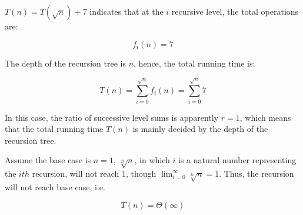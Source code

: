 \begin{homeworkProblem}
\begin{homeworkSubProblem}[$T(n)=3T(n/2)+5n$]
\end{homeworkSubProblem}

\begin{homeworkSubProblem}[$T(n)=T(\sqrt{n})+7$]

$T(n)=T(\sqrt{n})+7$ indicates that at the $i$ recursive level, the total operations are:

\begin{equation}
f_i(n) = 7
\end{equation}

The depth of the recursion tree is $n$, hence, the total running time is:

\begin{equation}
T(n) =\sum_{i=0}^{\sqrt{n}} f_i(n) = \sum_{i=0}^{\sqrt{n}} 7
\end{equation}

In this case, the ratio of successive level sums is apparently $r = 1$, which means that the total running time $T(n)$ is mainly decided by the depth of the recursion tree.

Assume the base case is $n=1$, $\sqrt[2i]{n}$, in which $i$ is a natural number representing the $ith$ recursion, will not reach $1$, though $\lim_{i=0}^{\infty} \sqrt[2i]{n}= 1$. Thus, the recursion will not reach base case, i.e.

\begin{equation} \label{eq:6.6}
T(n) = \Theta(\infty)
\end{equation}

\end{homeworkSubProblem}

\end{homeworkProblem}
